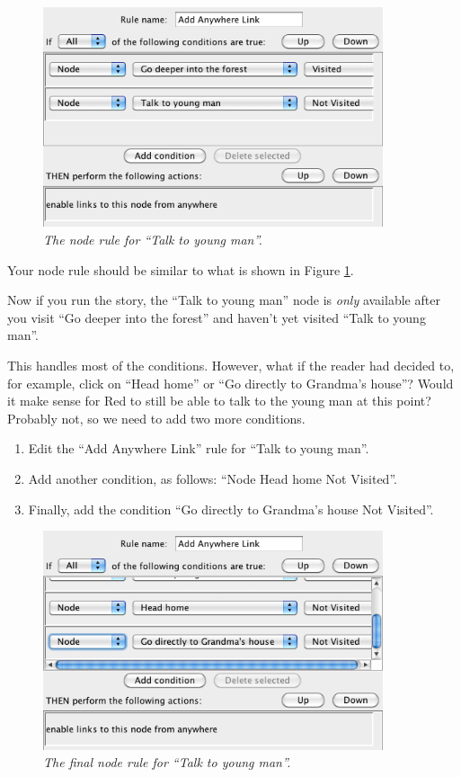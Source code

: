 \documentclass{article}
\begin{document}
\begin{figure}[h]
  \centering
  \includegraphics[width=10cm]{images/hypedyn-tutorial-3-figure-6}
  \caption{\textit{The node rule for ``Talk to young man''.}}
  \label{fig:tut3:talk}
\end{figure} 

Your node rule should be similar to what is shown in Figure \ref{fig:tut3:talk}.

Now if you run the story, the ``Talk to young man'' node is \textit{only}
available after you visit ``Go deeper into the forest'' and haven't yet
visited ``Talk to young man''.

This handles most of the conditions. However, what if the reader had decided
to, for example, click on ``Head home'' or ``Go directly to Grandma's house''?
Would it make sense for Red to still be able to talk to the young man at this
point? Probably not, so we need to add two more conditions.

\begin{enumerate}
  \item Edit the ``Add Anywhere Link'' rule for ``Talk to young man''.
  \item Add another condition, as follows: ``Node Head home Not
  Visited''.
  \item Finally, add the condition ``Go directly to Grandma's house Not
  Visited''.
\end{enumerate}

\begin{figure}[h]
  \centering
  \includegraphics[width=10cm]{images/hypedyn-tutorial-3-figure-7}
  \caption{\textit{The final node rule for ``Talk to young man''.}}
  \label{fig:tut3:talk_final}
\end{figure} 
\end{document}
